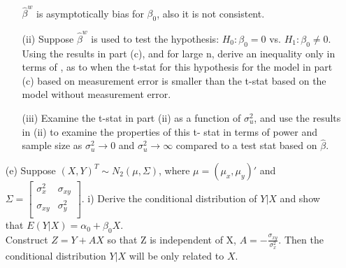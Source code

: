 \documentclass{article}
\begin{document}
\begin{itemize}
\begin{itemize}
\begin{align*}
    \end{align*}      
    $\hat{\beta}^w$ is asymptotically bias for $\beta_0$, also it is not consistent.\\
    \item[(ii)] Suppose $\hat{\beta}^w$ is used to test the hypothesis: $H_0: \beta_0=0$ vs. $H_1: \beta_0 \neq 0$. Using the results in part (c), and for large n, derive an inequality only in terms of , as to when the t-stat for this hypothesis for the model in part (c) based on measurement error is smaller than the t-stat based on the model without measurement error.\\
    
    \item[(iii)] Examine the t-stat in part (ii) as a function of $\sigma_u^2$, and use the results in (ii) to examine the properties of this t- stat in terms of power and sample size as $\sigma_u^2 \rightarrow 0$ and $\sigma_u^2 \rightarrow \infty$ compared to a test stat based on $\hat{\beta}$.
    \end{itemize}
    \item[(e)] Suppose $(X,Y)^T \sim N_2(\mu, \Sigma)$, where $\mu= (\mu_x, \mu_y)'$ and $\Sigma = \begin{bmatrix}
           \sigma_x^2  &  \sigma_{xy}  \\
            \sigma_{xy} &   \sigma_{y}^2\\
         \end{bmatrix}$. i) Derive the conditional distribution of $Y|X$ and show that $E(Y|X) = \alpha_0 + \beta_0 X$. \\
         Construct $Z= Y+ AX$ so that Z is independent of X, $A= -\frac{\sigma_{xy}}{\sigma_x^2}$. Then the conditional distribution $Y|X$ will be only related to $X$.
    \end{itemize}
    
\end{document}
